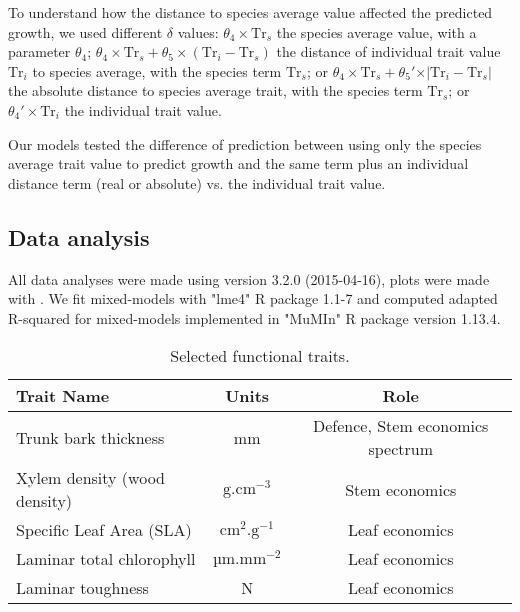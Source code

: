 To understand how the distance to species average value affected the predicted growth, we used different $\delta$ values: $\theta_4 \times \text{Tr}_s$ the species average value, with a parameter $\theta_4$; $\theta_4 \times \text{Tr}_s + \theta_5 \times(\text{Tr}_i - \text{Tr}_s)$ the distance of individual trait value $\text{Tr}_i$ to species average, with the species term $\text{Tr}_s$; or $\theta_4 \times \text{Tr}_s + \theta_5' \times \vert \text{Tr}_i - \text{Tr}_s \vert$ the absolute distance to species average trait, with the species term $\text{Tr}_s$; or $\theta_4' \times \text{Tr}_i$ the individual trait value.

Our models tested the difference of prediction between using only the species average trait value to predict growth and the same term plus an individual distance term (real or absolute) vs. the individual trait value.

\subsection*{Data analysis}

All data analyses were made using \citet{R_language} version 3.2.0 (2015-04-16), plots were made with \citet{ggplot2_pkg}. We fit mixed-models with "lme4" R package \citep{lme4_pkg} 1.1-7 and computed adapted R-squared for mixed-models \citep{nakagawa_general_2013} implemented in "MuMIn" R package \citep{mumin_pkg} version 1.13.4.

\begin{table}
	\begin{center}
		\begin{tabular}{lcc}
		\hline \hline
		Trait Name & Units & Role \\
		\hline
		Trunk bark thickness & mm & Defence, Stem economics spectrum \\
		Xylem density (wood density) & $\text{g}.\text{cm}^{-3}$ & Stem economics \\
		Specific Leaf Area (SLA) & $\text{cm}^2.\text{g}^{-1}$ & Leaf economics \\
		Laminar total chlorophyll & $\text{µm}.\text{mm}^{-2}$  & Leaf economics \\
		Laminar toughness & N & Leaf economics \\
		\hline \hline
		\end{tabular}
		\caption{Selected functional traits.}
		\label{tab:seltraits}
	\end{center}
\end{table}
